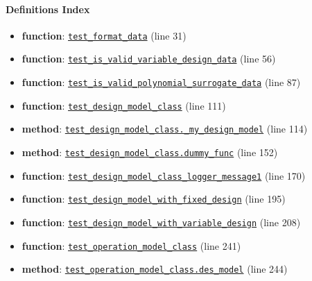 \documentclass[11pt]{report}
\begin{document}
\paragraph{Definitions Index}
\begin{itemize}[leftmargin=*]
  \item \textbf{function}: \hyperref[def:pricetaker-tests-test_design_and_operation_models.py:test_format_data:L31]{\texttt{test\_format\_data}} (line 31)
  \item \textbf{function}: \hyperref[def:pricetaker-tests-test_design_and_operation_models.py:test_is_valid_variable_design_data:L56]{\texttt{test\_is\_valid\_variable\_design\_data}} (line 56)
  \item \textbf{function}: \hyperref[def:pricetaker-tests-test_design_and_operation_models.py:test_is_valid_polynomial_surrogate_data:L87]{\texttt{test\_is\_valid\_polynomial\_surrogate\_data}} (line 87)
  \item \textbf{function}: \hyperref[def:pricetaker-tests-test_design_and_operation_models.py:test_design_model_class:L111]{\texttt{test\_design\_model\_class}} (line 111)
  \item \textbf{method}: \hyperref[def:pricetaker-tests-test_design_and_operation_models.py:test_design_model_class._my_design_model:L114]{\texttt{test\_design\_model\_class.\_my\_design\_model}} (line 114)
  \item \textbf{method}: \hyperref[def:pricetaker-tests-test_design_and_operation_models.py:test_design_model_class.dummy_func:L152]{\texttt{test\_design\_model\_class.dummy\_func}} (line 152)
  \item \textbf{function}: \hyperref[def:pricetaker-tests-test_design_and_operation_models.py:test_design_model_class_logger_message1:L170]{\texttt{test\_design\_model\_class\_logger\_message1}} (line 170)
  \item \textbf{function}: \hyperref[def:pricetaker-tests-test_design_and_operation_models.py:test_design_model_with_fixed_design:L195]{\texttt{test\_design\_model\_with\_fixed\_design}} (line 195)
  \item \textbf{function}: \hyperref[def:pricetaker-tests-test_design_and_operation_models.py:test_design_model_with_variable_design:L208]{\texttt{test\_design\_model\_with\_variable\_design}} (line 208)
  \item \textbf{function}: \hyperref[def:pricetaker-tests-test_design_and_operation_models.py:test_operation_model_class:L241]{\texttt{test\_operation\_model\_class}} (line 241)
  \item \textbf{method}: \hyperref[def:pricetaker-tests-test_design_and_operation_models.py:test_operation_model_class.des_model:L244]{\texttt{test\_operation\_model\_class.des\_model}} (line 244)

\end{itemize}
\end{document}
